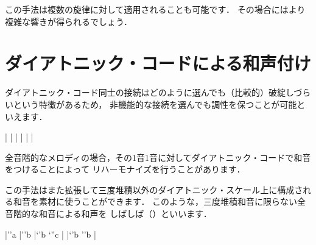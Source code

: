 \documentclass[dvipdfmx,uplatex,b5paper,openany,jbase=12Q,nomag*,textwidth-limit=44%
               ]{gachimuchi}
\begin{document}
この手法は複数の旋律に対して適用されることも可能です．
その場合にはより複雑な響きが得られるでしょう．


\section{ダイアトニック・コードによる和声付け}
ダイアトニック・コード同士の接続はどのように選んでも（比較的）破綻しづらいという特徴があるため，
非機能的な接続を選んでも調性を保つことが可能といえます．

\begin{Music}[.6\linewidth]
  \Startpiece%
  \NOTes
  |%
  \en\NOtesp
  |%
  \en\Notes
  |%
  \en\bar
  \NOTes
  |%
  \en\NOtes
  |%
  \en
  \setdoublebar\endpiece%
\end{Music}

全音階的なメロディの場合，その1音1音に対してダイアトニック・コードで和音をつけることによって
リハーモナイズを行うことがあります．

この手法はまた拡張して三度堆積以外のダイアトニック・スケール上に構成される和音を素材に使うことができます．
このような，三度堆積和音に限らない全音階的な和音による和声を
しばしば（）といいます．

\begin{Music}[.6\linewidth]
  \Startpiece%
  \znotes{}\en\NOtes
  |\rq{'a}%
  \en\Notes
  \sk{}%
  |\rq{'b}%
  \en\NOtes
  |\lq{'b}%
  \lq{''c}%
  \en\bar
  \NOtes
  |\lq{'b}%
  \rq{'b}%
  \en\NOTes
  |%
  \en\def\atnextbar{\znotes\centerbar{\duevolte}\en}%
  \setdoublebar\endpiece%
\end{Music}
\end{document}
